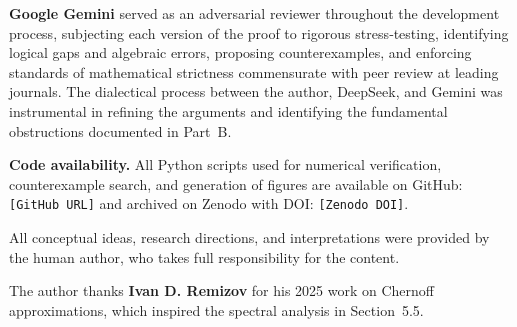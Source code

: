\documentclass[12pt,a4paper]{article}
\theoremstyle{definition}
\theoremstyle{remark}
\begin{document}
\textbf{Google Gemini} served as an adversarial reviewer throughout the
development process, subjecting each version of the proof to rigorous
stress‑testing, identifying logical gaps and algebraic errors,
proposing counterexamples, and enforcing standards of mathematical
strictness commensurate with peer review at leading journals. The
dialectical process between the author, DeepSeek, and Gemini was
instrumental in refining the arguments and identifying the fundamental
obstructions documented in Part~B.

\textbf{Code availability.} All Python scripts used for numerical
verification, counterexample search, and generation of figures are
available on GitHub: \texttt{[GitHub URL]} and archived on Zenodo with
DOI: \texttt{[Zenodo DOI]}.

All conceptual ideas, research directions, and interpretations were
provided by the human author, who takes full responsibility for the
content.

The author thanks \textbf{Ivan D. Remizov} for his 2025 work on
Chernoff approximations, which inspired the spectral analysis in
Section~5.5.
\end{document}
